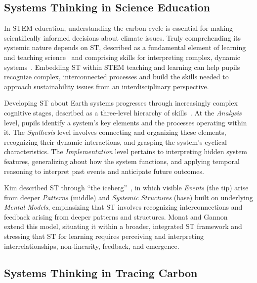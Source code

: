 \documentclass[letterpaper,journal]{IEEEtran}
\begin{document}
\subsection{Systems Thinking in Science Education}

In STEM education, understanding the carbon cycle is essential for making scientifically informed decisions about climate issues.
Truly comprehending its systemic nature depends on ST, described as a fundamental element of learning and teaching science~\cite{hmelor2007fish} and comprising skills for interpreting complex, dynamic systems~\cite{verhoeff2018theoretical}. 
Embedding ST within STEM teaching and learning can help pupils recognize complex, interconnected processes and build the skills needed to approach sustainability issues from an interdisciplinary perspective.

Developing ST about Earth systems progresses through increasingly complex cognitive stages, described as a three-level hierarchy of skills~\cite{assaraf2005development}.
At the \textit{Analysis} level, pupils identify a system's key elements and the processes operating within it.
The \textit{Synthesis} level involves connecting and organizing these elements, recognizing their dynamic interactions, and grasping the system's cyclical characteristics.
The \textit{Implementation} level pertains to interpreting hidden system features, generalizing about how the system functions, and applying temporal reasoning to interpret past events and anticipate future outcomes.

Kim described ST through ``the iceberg''~\cite{kim1999introduction}, in which visible \textit{Events} (the tip) arise from deeper \textit{Patterns} (middle) and \textit{Systemic Structures} (base) built on underlying \textit{Mental Models}, emphasizing that ST involves recognizing interconnections and feedback arising from deeper patterns and structures. 
Monat and Gannon~\cite{monat2015what} extend this model, situating it within a broader, integrated ST framework and stressing that ST for learning requires perceiving and interpreting interrelationships, non-linearity, feedback, and emergence.



\subsection{Systems Thinking in Tracing Carbon}
\end{document}
